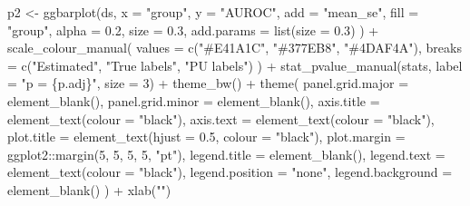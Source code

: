 \documentclass[
  11pt,
  oneside]{book}
\newenvironment{Shaded}{\begin{snugshade}}{\end{snugshade}}
\newcommand{\AttributeTok}[1]{\textcolor[rgb]{0.77,0.63,0.00}{#1}}
\newcommand{\DecValTok}[1]{\textcolor[rgb]{0.00,0.00,0.81}{#1}}
\newcommand{\FloatTok}[1]{\textcolor[rgb]{0.00,0.00,0.81}{#1}}
\newcommand{\FunctionTok}[1]{\textcolor[rgb]{0.00,0.00,0.00}{#1}}
\newcommand{\NormalTok}[1]{#1}
\newcommand{\OtherTok}[1]{\textcolor[rgb]{0.56,0.35,0.01}{#1}}
\newcommand{\SpecialCharTok}[1]{\textcolor[rgb]{0.00,0.00,0.00}{#1}}
\newcommand{\StringTok}[1]{\textcolor[rgb]{0.31,0.60,0.02}{#1}}
\begin{document}
\begin{Shaded}
\begin{Highlighting}[]
\NormalTok{p2 }\OtherTok{\textless{}{-}} \FunctionTok{ggbarplot}\NormalTok{(ds,}
  \AttributeTok{x =} \StringTok{"group"}\NormalTok{, }\AttributeTok{y =} \StringTok{"AUROC"}\NormalTok{, }\AttributeTok{add =} \StringTok{"mean\_se"}\NormalTok{, }\AttributeTok{fill =} \StringTok{"group"}\NormalTok{, }\AttributeTok{alpha =} \FloatTok{0.2}\NormalTok{, }\AttributeTok{size =} \FloatTok{0.3}\NormalTok{,}
  \AttributeTok{add.params =} \FunctionTok{list}\NormalTok{(}\AttributeTok{size =} \FloatTok{0.3}\NormalTok{)}
\NormalTok{) }\SpecialCharTok{+}
  \FunctionTok{scale\_colour\_manual}\NormalTok{(}
    \AttributeTok{values =} \FunctionTok{c}\NormalTok{(}\StringTok{"\#E41A1C"}\NormalTok{, }\StringTok{"\#377EB8"}\NormalTok{, }\StringTok{"\#4DAF4A"}\NormalTok{),}
    \AttributeTok{breaks =} \FunctionTok{c}\NormalTok{(}\StringTok{"Estimated"}\NormalTok{, }\StringTok{"True labels"}\NormalTok{, }\StringTok{"PU labels"}\NormalTok{)}
\NormalTok{  ) }\SpecialCharTok{+}
  \FunctionTok{stat\_pvalue\_manual}\NormalTok{(stats, }\AttributeTok{label =} \StringTok{"p = \{p.adj\}"}\NormalTok{, }\AttributeTok{size =} \DecValTok{3}\NormalTok{) }\SpecialCharTok{+}
  \FunctionTok{theme\_bw}\NormalTok{() }\SpecialCharTok{+}
  \FunctionTok{theme}\NormalTok{(}
    \AttributeTok{panel.grid.major =} \FunctionTok{element\_blank}\NormalTok{(),}
    \AttributeTok{panel.grid.minor =} \FunctionTok{element\_blank}\NormalTok{(),}
    \AttributeTok{axis.title =} \FunctionTok{element\_text}\NormalTok{(}\AttributeTok{colour =} \StringTok{"black"}\NormalTok{),}
    \AttributeTok{axis.text =} \FunctionTok{element\_text}\NormalTok{(}\AttributeTok{colour =} \StringTok{"black"}\NormalTok{),}
    \AttributeTok{plot.title =} \FunctionTok{element\_text}\NormalTok{(}\AttributeTok{hjust =} \FloatTok{0.5}\NormalTok{, }\AttributeTok{colour =} \StringTok{"black"}\NormalTok{),}
    \AttributeTok{plot.margin =}\NormalTok{ ggplot2}\SpecialCharTok{::}\FunctionTok{margin}\NormalTok{(}\DecValTok{5}\NormalTok{, }\DecValTok{5}\NormalTok{, }\DecValTok{5}\NormalTok{, }\DecValTok{5}\NormalTok{, }\StringTok{"pt"}\NormalTok{),}
    \AttributeTok{legend.title =} \FunctionTok{element\_blank}\NormalTok{(),}
    \AttributeTok{legend.text =} \FunctionTok{element\_text}\NormalTok{(}\AttributeTok{colour =} \StringTok{"black"}\NormalTok{),}
    \AttributeTok{legend.position =} \StringTok{"none"}\NormalTok{,}
    \AttributeTok{legend.background =} \FunctionTok{element\_blank}\NormalTok{()}
\NormalTok{  ) }\SpecialCharTok{+}
  \FunctionTok{xlab}\NormalTok{(}\StringTok{""}\NormalTok{)}
\end{Highlighting}
\end{Shaded}
\end{document}

